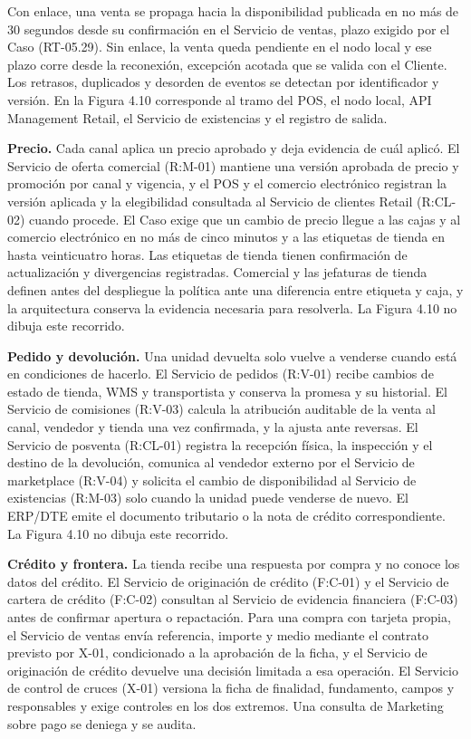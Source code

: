 \documentclass[11pt]{article}
\begin{document}
Con enlace, una venta se propaga hacia la disponibilidad publicada en no más de 30 segundos desde su confirmación en el Servicio de ventas, plazo exigido por el Caso (RT-05.29). Sin enlace, la venta queda pendiente en el nodo local y ese plazo corre desde la reconexión, excepción acotada que se valida con el Cliente. Los retrasos, duplicados y desorden de eventos se detectan por identificador y versión. En la Figura 4.10 corresponde al tramo del POS, el nodo local, API Management Retail, el Servicio de existencias y el registro de salida.

\textbf{Precio.} Cada canal aplica un precio aprobado y deja evidencia de cuál aplicó. El Servicio de oferta comercial (R:M-01) mantiene una versión aprobada de precio y promoción por canal y vigencia, y el POS y el comercio electrónico registran la versión aplicada y la elegibilidad consultada al Servicio de clientes Retail (R:CL-02) cuando procede. El Caso exige que un cambio de precio llegue a las cajas y al comercio electrónico en no más de cinco minutos y a las etiquetas de tienda en hasta veinticuatro horas. Las etiquetas de tienda tienen confirmación de actualización y divergencias registradas. Comercial y las jefaturas de tienda definen antes del despliegue la política ante una diferencia entre etiqueta y caja, y la arquitectura conserva la evidencia necesaria para resolverla. La Figura 4.10 no dibuja este recorrido.

\textbf{Pedido y devolución.} Una unidad devuelta solo vuelve a venderse cuando está en condiciones de hacerlo. El Servicio de pedidos (R:V-01) recibe cambios de estado de tienda, WMS y transportista y conserva la promesa y su historial. El Servicio de comisiones (R:V-03) calcula la atribución auditable de la venta al canal, vendedor y tienda una vez confirmada, y la ajusta ante reversas. El Servicio de posventa (R:CL-01) registra la recepción física, la inspección y el destino de la devolución, comunica al vendedor externo por el Servicio de marketplace (R:V-04) y solicita el cambio de disponibilidad al Servicio de existencias (R:M-03) solo cuando la unidad puede venderse de nuevo. El ERP/DTE emite el documento tributario o la nota de crédito correspondiente. La Figura 4.10 no dibuja este recorrido.

\textbf{Crédito y frontera.} La tienda recibe una respuesta por compra y no conoce los datos del crédito. El Servicio de originación de crédito (F:C-01) y el Servicio de cartera de crédito (F:C-02) consultan al Servicio de evidencia financiera (F:C-03) antes de confirmar apertura o repactación. Para una compra con tarjeta propia, el Servicio de ventas envía referencia, importe y medio mediante el contrato previsto por X-01, condicionado a la aprobación de la ficha, y el Servicio de originación de crédito devuelve una decisión limitada a esa operación. El Servicio de control de cruces (X-01) versiona la ficha de finalidad, fundamento, campos y responsables y exige controles en los dos extremos. Una consulta de Marketing sobre pago se deniega y se audita.
\end{document}
